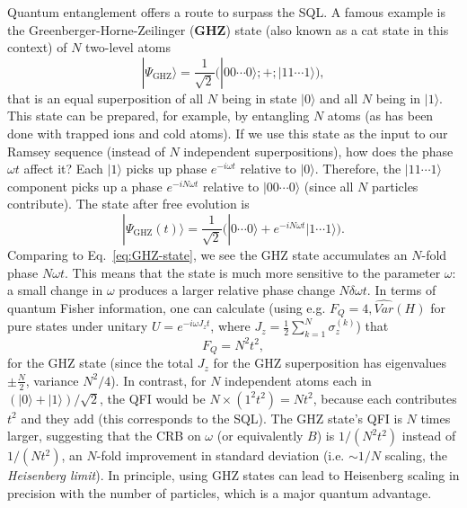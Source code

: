 Quantum entanglement offers a route to surpass the SQL. A famous
example is the Greenberger-Horne-Zeilinger (\textbf{GHZ}) state (also
known as a cat state in this context) of $N$ two-level atoms
\begin{equation}
|\Psi_{\text{GHZ}}\rangle = \frac{1}{\sqrt{2}}\Big(|0 0 \cdots 0\rangle ;+; |1 1 \cdots 1\rangle\Big),
\label{eq:GHZ-state}
\end{equation}
that is an equal superposition of all $N$ being in state $|0\rangle$ and
all $N$ being in $|1\rangle$. This state can be prepared, for example,
by entangling $N$ atoms (as has been done with trapped ions and cold
atoms). If we use this state as the input to our Ramsey sequence
(instead of $N$ independent superpositions), how does the phase
$\omega t$ affect it? Each $|1\rangle$ picks up phase $e^{-i\omega t}$
relative to $|0\rangle$. Therefore, the $|11\cdots1\rangle$ component
picks up a phase $e^{-i N \omega t}$ relative to $|00\cdots0\rangle$
(since all $N$ particles contribute). The state after free evolution
is
\[
|\Psi_{\text{GHZ}}(t)\rangle = \frac{1}{\sqrt{2}}\Big(|0\cdots0\rangle + e^{-i N \omega t} |1\cdots1\rangle\Big).
\]
Comparing to Eq.~\eqref{eq:GHZ-state}, we see the GHZ state
accumulates an $N$-fold phase $N\omega t$. This means that the state
is much more sensitive to the parameter $\omega$: a small change in
$\omega$ produces a larger relative phase change $N\delta\omega t$. In
terms of quantum Fisher information, one can calculate (using
e.g. $F_Q = 4,\widehat{Var}(H)$ for pure states under unitary $U=e^{-i\omega
  J_z t}$, where $J_z = \frac{1}{2}\sum_{k=1}^N \sigma^{(k)}_z$) that
\[
F_Q = N^2 t^2,
\]
for the GHZ state (since the total $J_z$ for the GHZ superposition has
eigenvalues $\pm \frac{N}{2}$, variance $N^2/4$). In contrast, for $N$
independent atoms each in $(|0\rangle+|1\rangle)/\sqrt{2}$, the QFI
would be $N \times (1^2 t^2) = N t^2$, because each contributes $t^2$
and they add (this corresponds to the SQL). The GHZ state’s QFI is $N$
times larger, suggesting that the CRB on $\omega$ (or equivalently
$B$) is $1/(N^2 t^2)$ instead of $1/(N t^2)$, an $N$-fold improvement
in standard deviation (i.e. $\sim 1/N$ scaling, the \textit{Heisenberg
  limit}). In principle, using GHZ states can lead to Heisenberg
scaling in precision with the number of particles, which is a major
quantum advantage.




